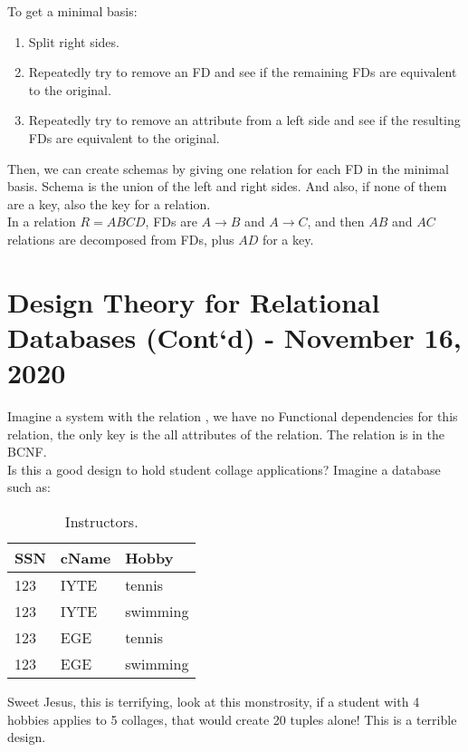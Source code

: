\documentclass[11pt,a4paper,twocolumn]{book}
\begin{document}
To get a minimal basis:

\begin{enumerate}
\item Split right sides.
\item Repeatedly try to remove an FD and see if the remaining FDs are equivalent to the original.
\item Repeatedly try to remove an attribute from a left side and see if the resulting FDs are equivalent to the original.
\end{enumerate}

Then, we can create schemas by giving one relation for each FD in the minimal basis. Schema is the union of the left and right sides. And also, if none of them are a key, also the key for a relation.\\

In a relation $R=ABCD$, FDs are $A \to B$ and $A \to C$, and then $AB$ and $AC$ relations are decomposed from FDs, plus $AD$ for a key.

\chapter{Design Theory for Relational Databases (Cont`d) - November 16, 2020}

\newcommand{\C}[1]{\code{#1}}
\newcommand{\ApplyExample}{\C{Apply(SSN, cName, hobby)}}
Imagine a system with the relation \C{Apply(SSN, cName, hobby)}, we have no Functional dependencies for this relation, the only key is the all attributes of the relation. The relation is in the BCNF.\\

Is this a good design to hold student collage applications? Imagine a database such as:
\begin{table}[h]
    \begin{tabular}{lll}
		SSN & cName & Hobby\\
        \toprule
        123 & IYTE & tennis\\
        123 & IYTE & swimming\\
        123 & EGE & tennis\\
        123 & EGE & swimming\\
        \bottomrule
    \end{tabular}
    \caption{Instructors.}
    \label{tab:inst}
\end{table}

Sweet Jesus, this is terrifying, look at this monstrosity, if a student with 4 hobbies applies to 5 collages, that would create 20 tuples alone! This is a terrible design.
\end{document}
